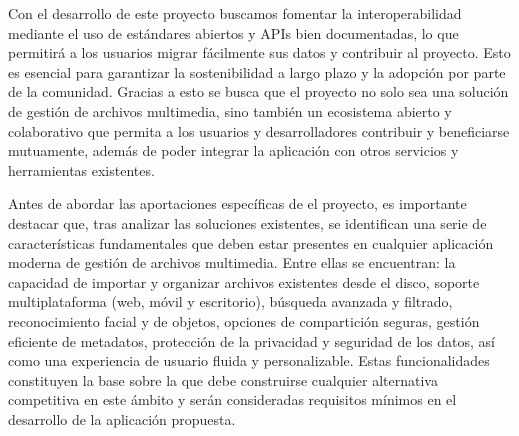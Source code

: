 Con el desarrollo de este proyecto buscamos fomentar la interoperabilidad mediante el uso de estándares abiertos y APIs bien documentadas, lo que permitirá a los usuarios migrar fácilmente sus datos y contribuir al proyecto. Esto es esencial para garantizar la sostenibilidad a largo plazo y la adopción por parte de la comunidad.
Gracias a esto se busca que el proyecto no solo sea una solución de gestión de archivos multimedia, sino también un ecosistema abierto y colaborativo que permita a los usuarios y desarrolladores contribuir y beneficiarse mutuamente, además de poder integrar la aplicación con otros servicios y herramientas existentes.

Antes de abordar las aportaciones específicas de el proyecto, es importante destacar que, tras analizar las soluciones existentes, se identifican una serie de características fundamentales que deben estar presentes en cualquier aplicación moderna de gestión de archivos multimedia. Entre ellas se encuentran: la capacidad de importar y organizar archivos existentes desde el disco, soporte multiplataforma (web, móvil y escritorio), búsqueda avanzada y filtrado, reconocimiento facial y de objetos, opciones de compartición seguras, gestión eficiente de metadatos, protección de la privacidad y seguridad de los datos, así como una experiencia de usuario fluida y personalizable. Estas funcionalidades constituyen la base sobre la que debe construirse cualquier alternativa competitiva en este ámbito y serán consideradas requisitos mínimos en el desarrollo de la aplicación propuesta.
